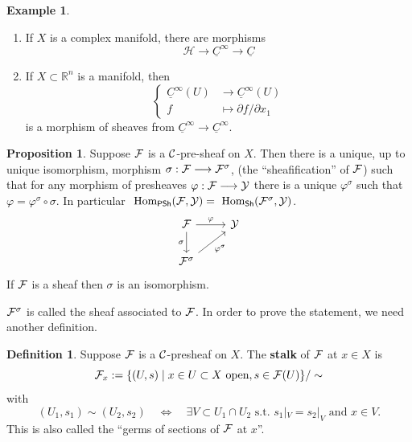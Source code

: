 \documentclass[11pt]{article}
\theoremstyle{definition}
\newtheorem{prop}[thm]{Proposition}
\newtheorem{dfn}[thm]{Definition}
\newtheorem{ex}[thm]{Example}
\renewcommand{\hom}{\text{ Hom}}
\newcommand{\reals}{\mathbb R}
\newcommand{\calf}{{\cal F}}
\newcommand{\calc}{{\cal C}}
\begin{document}
\begin{ex}\ 
    \begin{enumerate}[label=(\arabic*)]
        \item 
        If $X$ is a complex manifold, there are morphisms
        $$
        \mathcal H \longrightarrow \underline C^\infty \longrightarrow \underline C
        $$
        \item
        If $X\subset \reals^n$ is a manifold, then
        $$
        \left\{
        \begin{aligned}
        \underline C^\infty (U) & \longrightarrow \underline C^\infty(U) \\
        f & \longmapsto \partial f / \partial x_1
        \end{aligned}
        \right.
        $$
        is a morphism of sheaves from $\underline C^\infty \longrightarrow \underline C^\infty$.
    \end{enumerate}
\end{ex}

\begin{prop}
    Suppose $\calf$ is a $\calc$-pre-sheaf on $X$. Then there is a unique, up to unique isomorphism, morphism $\sigma: \calf\longrightarrow \calf^\sigma$, (the ``sheafification'' of $\calf$) such that for any morphism of presheaves $\varphi: \calf \longrightarrow \mathcal Y$ there is a unique $\varphi^\sigma$ such that $\varphi = \varphi^\sigma \circ \sigma$. In particular $\hom_{\mathsf{PSh}} (\calf, \mathcal Y) = \hom_{\mathsf{Sh}} (\calf^\sigma, \mathcal Y)$.
    $$
    \begin{tikzcd}
    \calf \arrow[r, "\varphi"] \arrow[d, "\sigma"'] & \mathcal Y  \\
    \calf^\sigma \arrow{ru}[swap]{\varphi^\sigma}
    \end{tikzcd}
    $$
    If $\calf$ is a sheaf then $\sigma$ is an isomorphism.
\end{prop}

$\calf^\sigma$ is called the sheaf associated to $\calf$. In order to prove the statement, we need another definition.

\begin{dfn}
    Suppose $\calf$ is a $\calc$-presheaf on $X$. The \textbf{stalk} of $\calf$ at $x\in X$ is 
        $$
        \calf_x := \{ (U,s) \mid x \in U\subset X \text{ open}, s \in \calf(U)\} / \sim
        $$
        with 
        $$(U_1, s_1) \sim (U_2,s_2) \quad \Longleftrightarrow \quad \exists V\subset U_1 \cap U_2 \text{ s.t. } s_1|_V = s_2|_V \text{ and } x \in V.
        $$
        This is also called the ``germs of sections of $\calf$ at $x$''.
\end{dfn}
\end{document}
